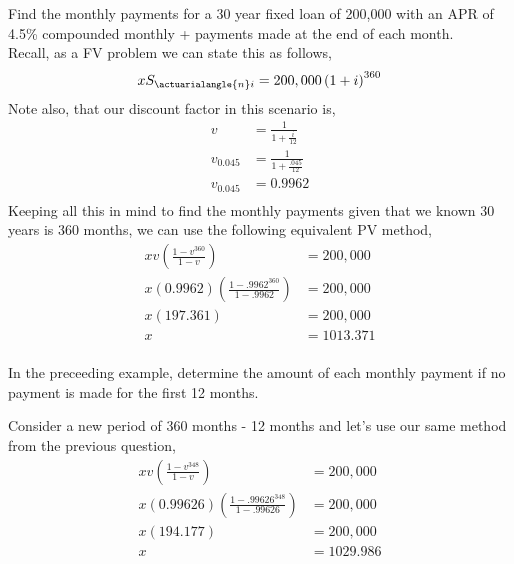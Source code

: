 \documentclass[12pt]{article}
\newenvironment{question}[2][Question]{\begin{trivlist}
\item[\hskip \labelsep {\bfseries #1}\hskip \labelsep {\bfseries #2.}]}{\end{trivlist}}
\begin{document}
\begin{question}[Question 2.2.7]
	a Find the monthly payments for a 30 year fixed loan of 200,000
	with an APR of 4.5\% compounded monthly + payments made at the end
	of each month.\\

	Recall, as a FV problem we can state this as follows,\\
	\begin{align*}
		xS_{\actuarialangle{n}i} &= 200,000 \left(1+i \right)^{360}\\
	\end{align*}
	Note also, that our discount factor in this scenario is,\\
	\begin{align*}
		v &= \frac{1}{1+\frac{i}{12}}\\
		v_{0.045} &= \frac{1}{1+\frac{.045}{12}}\\
		v_{0.045} &= 0.9962\\
	\end{align*}
	Keeping all this in mind to find the monthly payments  given that we known 30 years
	is 360 months, we can use the following equivalent PV method,\\
	\begin{align*}
		xv \left(\frac{1-v^{360}}{1-v}\right) &= 200,000\\
		x \left(0.9962 \right)(\frac{1-.9962^{360}}{1-.9962})&= 200,000\\
		x \left(197.361\right) &= 200,000\\
		x &= 1013.371\\
	\end{align*}

\hline
\pagebreak

\begin{question}[Question 2.2.11]
	a In the preceeding example, determine the amount of each monthly payment
	if no payment is made for the first 12 months.\\
\end{question}

Consider a new period of 360 months - 12 months and let's use our same method from the previous question,\\
	\begin{align*}
	{xv \left(\frac{1-v^{348}}{1-v}\right)} &= 200,000\\
	x \left(0.99626 \right)(\frac{1-.99626^{348}}{1-.99626})&= 200,000\\
	x \left(194.177\right) &= 200,000\\
	x &= 1029.986\\
	\end{align*}
    

\end{question}
\end{document}

